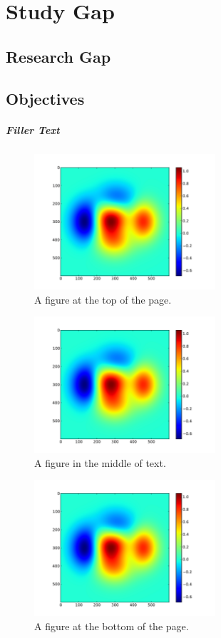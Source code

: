\chapter{Study Gap}

\section{Research Gap}

\section{Objectives}

\paragraph{Filler Text} \lipsum[1-6]
%
\begin{figure}[t]
  \centering
  \includegraphics[width=0.6\textwidth]{Chapter-2/figs/color}
  \caption{A figure at the top of the page.}
  \label{fig:ch3.1}
\end{figure}
%
\lipsum[7-13]
%
\begin{figure}[!h]
  \centering
  \includegraphics[width=0.6\textwidth]{Chapter-2/figs/color}
  \caption{A figure in the middle of text.}
  \label{fig:ch3.2}
\end{figure}
%
\begin{figure}[!b]
  \centering
  \includegraphics[width=0.6\textwidth]{Chapter-2/figs/color}
  \caption{A figure at the bottom of the page.}
  \label{fig:ch3.3}
\end{figure}
%
\lipsum[14-20]

